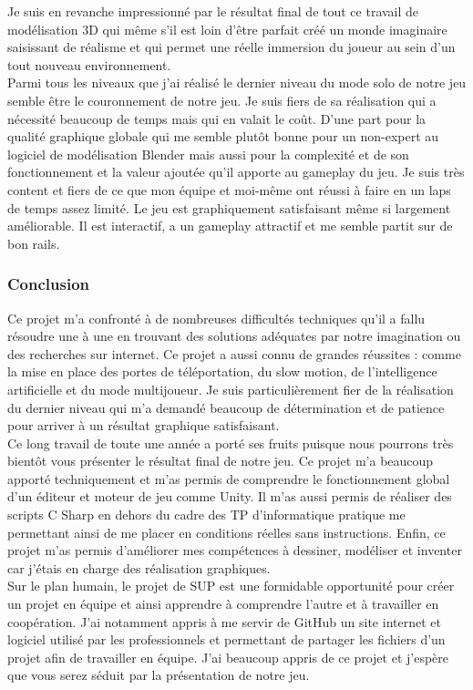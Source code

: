 \documentclass[12pt]{article}
\begin{document}
Je suis en revanche impressionné par le résultat final de tout ce travail de modélisation 3D qui même s’il est loin d'être parfait créé un monde imaginaire saisissant de réalisme et qui permet une réelle immersion du joueur au sein d'un tout nouveau environnement.\\
Parmi tous les niveaux que j'ai réalisé le dernier niveau du mode solo de notre jeu semble être le couronnement de notre jeu. Je suis fiers de sa réalisation qui a nécessité beaucoup de temps mais qui en valait le coût. D’une part pour la qualité graphique globale qui me semble plutôt bonne pour un non-expert au logiciel de modélisation Blender mais aussi pour la complexité et de son fonctionnement et la valeur ajoutée qu’il apporte au gameplay du jeu. 
Je suis très content et fiers de ce que mon équipe et moi-même ont réussi à faire en un laps de temps assez limité. Le jeu est graphiquement satisfaisant même si largement améliorable. Il est interactif, a un gameplay attractif et me semble partit sur de bon rails.

\newpage

\subsubsection{Conclusion}

Ce projet m'a confronté à de nombreuses difficultés techniques qu'il a fallu résoudre une à une en trouvant des solutions adéquates par notre imagination ou des recherches sur internet. Ce projet a aussi connu de grandes réussites : comme la mise en place des portes de téléportation, du slow motion, de l'intelligence artificielle et du mode multijoueur. Je suis particulièrement fier de la réalisation du dernier niveau qui m'a demandé beaucoup de détermination et de patience pour arriver à un résultat graphique satisfaisant.\\
Ce long travail de toute une année a porté ses fruits puisque nous pourrons très bientôt vous présenter le résultat final de notre jeu. Ce projet m'a beaucoup apporté techniquement et m'as permis de comprendre le fonctionnement global d'un éditeur et moteur de jeu comme Unity. Il m'as aussi permis de réaliser des scripts \gls{C Sharp} en dehors du cadre des TP d'informatique pratique me permettant ainsi de me placer en conditions réelles sans instructions. Enfin, ce projet m'as permis d'améliorer mes compétences à dessiner, modéliser et inventer car j'étais en charge des réalisation graphiques.\\
Sur le plan humain, le projet de SUP est une formidable opportunité pour créer un projet en équipe et ainsi apprendre à comprendre l'autre et à travailler en coopération. J'ai notamment appris à me servir de GitHub un site internet et logiciel utilisé par les professionnels et permettant de partager les fichiers d'un projet afin de travailler en équipe. J'ai beaucoup appris de ce projet et j'espère que vous serez séduit par la présentation de notre jeu.
\end{document}
